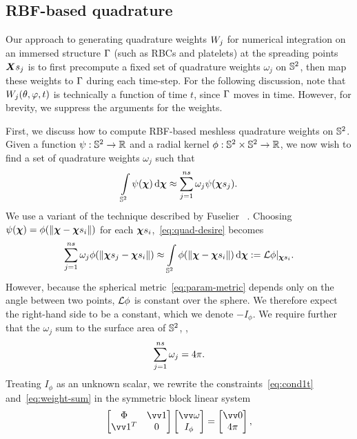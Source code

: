 \subsection{RBF-based quadrature}\label{sec:rbf-quadrature}

Our approach to generating quadrature weights $\weight[j]$ for numerical integration on an immersed structure
$\Gamma$ (such as RBCs and platelets) at the spreading points $\Xsj$ is to first precompute a fixed set of
quadrature weights $\omega_j$ on $\mathbb{S}^2$, then map these weights to $\Gamma$ during each time-step. For the
following discussion, note that $\weight[j](\theta,\varphi,t)$ is technically a function of time $t$, since
$\Gamma$ moves in time. However, for brevity, we suppress the arguments for the weights.

First, we discuss how to compute RBF-based meshless quadrature weights on $\mathbb{S}^2$. Given a function
$\psi:\mathbb{S}^2\to\mathbb{R}$ and a radial kernel $\phi:\mathbb{S}^2\times\mathbb{S}^2\to\mathbb{R}$, we now wish to find a set of quadrature
weights $\omega_j$ such that
\begin{equation}\label{eq:quad-desire}
    \int\limits_{\sphere} \psi(\Xp) \d\Xp \approx \sum_{j=1}^{\sample\cardinality} \omega_j \psi(\Xpsj).
\end{equation}
We use a variant of the technique described by Fuselier ~\cite{Fuselier:2013coba}.  Choosing
$\psi(\Xp) = \phi(\|\Xp-\sample\Xp_i\|)$ for each $\sample\Xp_i$,~\eqref{eq:quad-desire} becomes
\begin{equation}
    \sum_{j=1}^{\sample\cardinality} \omega_j \phi(\|\Xpsj-\sample\Xp_i\|)
    \approx \int\limits_{\sphere}\phi(\|\Xp-\sample\Xp_i\|) \d\Xp := \L\phi|_{\sample\Xp_i}.
    \label{eq:cond1t}
\end{equation}
However, because the spherical metric~\eqref{eq:param-metric} depends only on the angle between two points,
$\mathcal{L}\phi$ is constant over the sphere. We therefore expect the right-hand side to be a constant, which we denote
$-I_\phi$. We require further that the $\omega_j$ sum to the surface area of $\mathbb{S}^2$, ,
\begin{equation}\label{eq:weight-sum}
    \sum_{j=1}^{\sample\cardinality} \omega_j  = 4\pi.
\end{equation}
Treating $I_\phi$ as an unknown scalar, we rewrite the constraints~\eqref{eq:cond1t} and~\eqref{eq:weight-sum} in
the symmetric block linear system
\begin{equation}\label{eq:rbf-quadrature}
    \begin{bmatrix}
            \Phi & \arr{1} \\ \arr{1}^T & 0
    \end{bmatrix}\begin{bmatrix}
            \arr{\omega} \\ I_\phi
    \end{bmatrix} = \begin{bmatrix}
            \arr{0} \\ 4\pi
    \end{bmatrix},
\end{equation}
